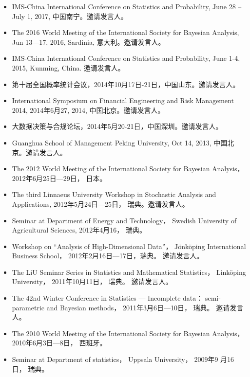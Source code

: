 \documentclass[twoside,a4paper,11pt]{article}
\begin{document}
\begin{itemize}
\item IMS-China International Conference on Statistics and Probability, June 28 – July 1,
  2017, 中国南宁。邀请发言人。


\item The 2016 World Meeting of the International Society for Bayesian Analysis, Jun
  13—17, 2016, Sardinia, 意大利。邀请发言人。

\item IMS-China International Conference on Statistics and Probability, June 1-4, 2015,
  Kunming, China. 邀请发言人。

\item 第十届全国概率统计会议，2014年10月17日-21日，中国山东。邀请发言人。

\item International Symposium on Financial Engineering and Risk Management 2014, 2014年6月27,
  2014, 中国北京。邀请发言人。

\item 大数据决策与合规论坛，2014年5月20-21日，中国深圳。邀请发言人。

\item Guanghua School of Management Peking University, Oct 14, 2013, 中国北京。邀请发言人。

\item The 2012 World Meeting of the International Society for Bayesian
  Analysis， 2012年6月25日---29日， 日本。

\item The third Linnaeus University Workshop in Stochastic Analysis and
  Applications, 2012年5月24日---25日， 瑞典。邀请发言人。

\item Seminar at Department of Energy and Technology， Swedish
  University of Agricultural Sciences, 2012年4月16， 瑞典。

\item Workshop on ``Analysis of High-Dimensional Data''，
  Jönköping International Business School， 2012年2月16日---17日，瑞典。
  邀请发言人。

\item The LiU Seminar Series in Statistics and Mathematical Statistics，
  Linköping University， 2011年10月11日， 瑞典。 邀请发言人。

\item The 42nd Winter Conference in Statistics --- Incomplete data：
  semi-parametric and Bayesian methods， 2011年3月6日---10日，
  瑞典。 邀请发言人。

\item The 2010 World Meeting of the International Society for Bayesian
  Analysis， 2010年6月3日---8日， 西班牙。

\item Seminar at Department of statistics， Uppsala University， 2009年9
  月16日， 瑞典。

\end{itemize}
\end{document}

